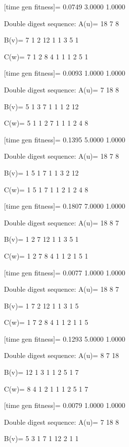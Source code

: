 [time gen fitness]=
    0.0749    3.0000    1.0000

Double digest sequence:
A(u)=
    18     7     8

B(v)=
     7     1     2    12     1     1     3     5     1

C(w)=
     7     1     2     8     4     1     1     1     2     5     1

[time gen fitness]=
    0.0093    1.0000    1.0000

Double digest sequence:
A(u)=
     7    18     8

B(v)=
     5     1     3     7     1     1     1     2    12

C(w)=
     5     1     1     2     7     1     1     1     2     4     8

[time gen fitness]=
    0.1395    5.0000    1.0000

Double digest sequence:
A(u)=
    18     7     8

B(v)=
     1     5     1     7     1     1     3     2    12

C(w)=
     1     5     1     7     1     1     2     1     2     4     8

[time gen fitness]=
    0.1807    7.0000    1.0000

Double digest sequence:
A(u)=
    18     8     7

B(v)=
     1     2     7    12     1     1     3     5     1

C(w)=
     1     2     7     8     4     1     1     2     1     5     1

[time gen fitness]=
    0.0077    1.0000    1.0000

Double digest sequence:
A(u)=
    18     8     7

B(v)=
     1     7     2    12     1     1     3     1     5

C(w)=
     1     7     2     8     4     1     1     2     1     1     5

[time gen fitness]=
    0.1293    5.0000    1.0000

Double digest sequence:
A(u)=
     8     7    18

B(v)=
    12     1     3     1     1     2     5     1     7

C(w)=
     8     4     1     2     1     1     1     2     5     1     7

[time gen fitness]=
    0.0079    1.0000    1.0000

Double digest sequence:
A(u)=
     7    18     8

B(v)=
     5     3     1     7     1    12     2     1     1

